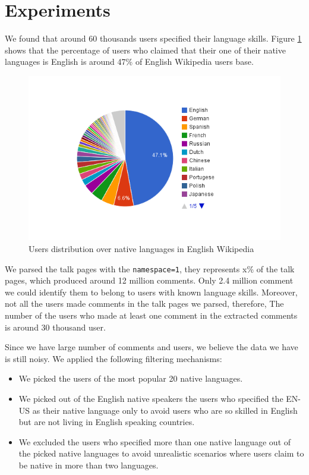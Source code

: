 \documentclass[11pt]{article}
\begin{document}
\section{Experiments}
We found that around 60 thousands users specified their language skills. Figure \ref{native_dist} shows that the percentage of users who claimed that their one of their native languages is English is around 47\% of English Wikipedia users base. 
\begin{figure}[htp]

\includegraphics[scale=0.56]{chart_4.png}
\caption{Users distribution over native languages in English Wikipedia}
\label{native_dist}
\end{figure}

We parsed the talk pages with the \verb+namespace=1+, they represents x\% of the talk pages, which produced around 12 million comments. Only 2.4 million comment we could identify them to belong to users with known language skills. Moreover, not all the users made comments in the talk pages we parsed, therefore, The number of the users who made at least one comment in the extracted comments is around 30 thousand user.

Since we have large number of comments and users, we believe the data we have is still noisy. We applied the following filtering mechanisms:
\begin{itemize}
\item We picked the users of the most popular 20 native languages.
\item We picked out of the English native speakers the users who specified the EN-US as their native language only to avoid users who are so skilled in English but are not living in English speaking countries.
\item We excluded the users who specified more than one native language out of the picked native languages to avoid unrealistic scenarios where users claim to be native in more than two languages.
\end{itemize}
\end{document}
